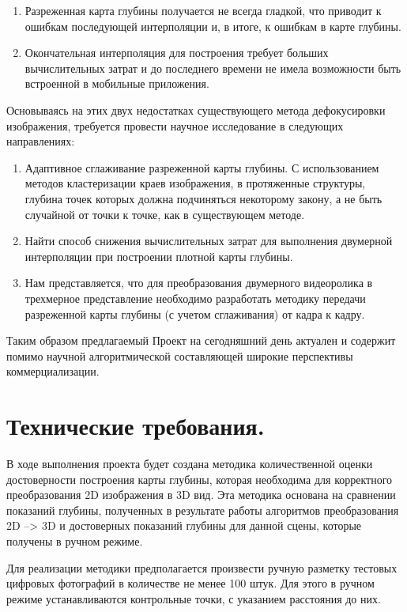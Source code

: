 \begin{enumerate}
	\item Разреженная карта глубины получается не всегда гладкой, что приводит к ошибкам последующей интерполяции и, в итоге, к ошибкам в карте глубины. 
	\item Окончательная интерполяция для построения требует больших вычислительных затрат и до последнего времени не имела возможности быть встроенной в мобильные приложения. 
\end{enumerate}

Основываясь на этих двух недостатках существующего метода дефокусировки изображения, требуется провести научное исследование в следующих направлениях:

\begin{enumerate}
	\item Адаптивное сглаживание разреженной карты глубины.  С использованием методов кластеризации краев изображения, в протяженные структуры, глубина точек которых должна подчиняться некоторому закону, а не быть случайной от точки к точке, как в существующем методе. 
	\item Найти способ снижения вычислительных затрат для выполнения двумерной интерполяции при построении плотной карты глубины. 
	\item Нам представляется, что для преобразования двумерного видеоролика в трехмерное представление необходимо разработать методику передачи разреженной карты глубины (с учетом сглаживания) от кадра к кадру. 
\end{enumerate}

Таким образом предлагаемый Проект на сегодняшний день актуален и содержит помимо научной алгоритмической составляющей широкие перспективы коммерциализации.

\section{Технические требования.}

В ходе выполнения проекта будет создана методика количественной оценки достоверности построения карты глубины, которая необходима для корректного преобразования 2D изображения в 3D вид. Эта методика основана на сравнении показаний глубины, полученных в результате работы алгоритмов преобразования 2D –> 3D и достоверных показаний глубины для данной сцены, которые получены в ручном режиме.

Для реализации методики предполагается произвести ручную разметку тестовых цифровых фотографий в количестве не менее 100 штук. Для этого в ручном режиме устанавливаются контрольные точки, с указанием расстояния до них.

